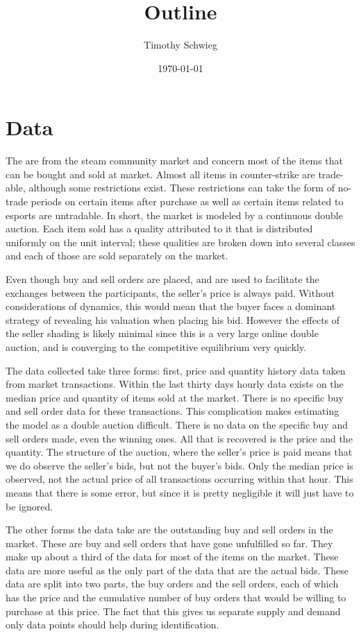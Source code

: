 \documentclass[12pt, letterpaper]{paper}
\author{Timothy Schwieg}
\date{\today}
\title{Outline}
\begin{document}
\maketitle

\section{Data}
\label{sec-1}
The are from the steam community market and concern most of the items
that can be bought and sold at market. Almost all items in
counter-strike are trade-able, although some restrictions exist. These
restrictions can take the form of no-trade periods on certain items
after purchase as well as certain items related to esports are
untradable. In short, the market is modeled by a continuous double
auction. Each item sold has a quality attributed to it that is
distributed uniformly on the unit interval; these qualities are broken
down into several classes and each of those are sold separately on the
market.

Even though buy and sell orders are placed, and are used to
facilitate the exchanges between the participants, the seller's price
is always paid. Without considerations of dynamics, this would mean
that the buyer faces a dominant strategy of revealing his valuation
when placing his bid. However the effects of the seller shading is
likely minimal since this is a very large online double auction,
and is converging to the competitive equilibrium very quickly.

The data collected take three forms: first, price and
quantity history data taken from market transactions. Within the last
thirty days hourly data exists on the median price and quantity of items
sold at the market. There is no specific buy and sell order data
for these transactions. This complication makes estimating the model
as a double auction difficult. There is no data on the specific buy
and sell orders made, even the winning ones. All that is recovered is
the price and the quantity. The structure of the auction, where the
seller's price is paid means that we do observe the seller's bids, but
not the buyer's bids. Only the median price is observed, not
the actual price of all transactions occurring within that hour. This
means that there is some error, but since it is pretty negligible it
will just have to be ignored.

The other forms the data take are the outstanding buy and sell orders
in the market. These are buy and sell orders that have gone
unfulfilled so far. They make up about a third of the data for most of
the items on the market. These data are more useful as the
only part of the data that are the actual bids. These data are split into
two parts, the buy orders and the sell orders, each of which has the
price and the cumulative number of buy orders that would be willing to
purchase at this price. The fact that this gives us separate supply
and demand only data points should help during
identification. 
\end{document}
